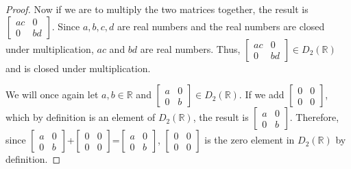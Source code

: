 \documentclass[11 pt]{article}
\newcommand{\newpar}{\vspace{.15in}\noindent}
\begin{document}
\begin{proof}
  \newpar
Now if we are to multiply the two matrices together, the result is $\begin{bmatrix}
    ac & 0 \\
    0 & bd
  \end{bmatrix}$. Since $a, b, c , d$ are real numbers and the real numbers are closed under multiplication, $ac$ and $bd$ are real numbers. Thus, $\begin{bmatrix}
    ac & 0 \\
    0 & bd
  \end{bmatrix}\in D_2(\mathbb{R})$ and is closed under multiplication.
  
  \newpar
  We will once again let $a, b\in \mathbb{R}$ and $\begin{bmatrix}
    a & 0 \\
    0 & b
  \end{bmatrix}\in D_2(\mathbb{R})$. If we add $\begin{bmatrix}
    0 & 0 \\
    0 & 0
  \end{bmatrix}$, which by definition is an element of $D_2(\mathbb{R})$, the result is $\begin{bmatrix}
    a & 0 \\
    0 & b
  \end{bmatrix}$. Therefore, since $\begin{bmatrix}
    a & 0 \\
    0 & b
  \end{bmatrix}$+$\begin{bmatrix}
    0 & 0 \\
    0 & 0
  \end{bmatrix}$=$\begin{bmatrix}
    a & 0 \\
    0 & b
  \end{bmatrix}$, $\begin{bmatrix}
    0 & 0 \\
    0 & 0
  \end{bmatrix}$ is the zero element in $D_2(\mathbb{R})$ by definition.
  

\end{proof}
\end{document}

